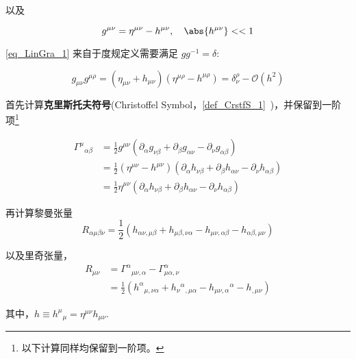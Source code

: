 以及

\begin{equation}\label{eq_LinGra_1}
g^{\mu\nu} = \eta^{\mu\nu} - h^{\mu\nu} , \quad \abs{h^{\mu\nu}}<<1 
\end{equation}

\autoref{eq_LinGra_1} 来自于度规定义需要满足 $gg^{-1}=\delta$:

\begin{equation}
g_{\mu\nu}g^{\mu\rho} = (\eta_{\mu\nu} + h_{\mu\nu})(\eta^{\mu\rho} - h^{\mu\rho}) = \delta^{\rho}_{\nu} - \mathcal{O}(h^2)
\end{equation}

首先计算\textbf{克里斯托夫符号}(Christoffel Symbol，\autoref{def_CrstfS_1}~)，并保留到一阶项\footnote{以下计算同样均保留到一阶项。}

\begin{equation}
\begin{aligned}
\Gamma^{\mu}{}_{\alpha\beta}&=\frac{1}{2}g^{\mu\nu}(\partial_\alpha g_{\nu\beta} + \partial_\beta g_{\alpha\nu} - \partial_\nu g_{\alpha\beta})\\
&=\frac{1}{2}(\eta^{\mu\nu} - h^{\mu\nu})(\partial_\alpha h_{\nu\beta} + \partial_\beta h_{\alpha\nu} - \partial_\nu h_{\alpha\beta})\\
&=\frac{1}{2}\eta^{\mu\nu} (\partial_\alpha h_{\nu\beta} + \partial_\beta h_{\alpha\nu} - \partial_\nu h_{\alpha\beta})
\end{aligned}
\end{equation}



再计算黎曼张量
\begin{equation}
R_{\alpha \mu \beta \nu}=\frac{1}{2}\left(h_{\alpha \nu, \mu \beta}+h_{\mu \beta, \nu \alpha}-h_{\mu \nu, \alpha \beta}-h_{\alpha \beta, \mu \nu}\right)
\end{equation}


以及里奇张量，
\begin{equation}
\begin{aligned}
R_{\mu\nu} &= \Gamma^{\alpha}{}_{\mu\nu,\alpha} - \Gamma^{\alpha}_{\mu\alpha,\nu}\\
&=\frac{1}{2}\left(h^{\alpha}{}_{\mu, \nu \alpha} + h_{\nu}{ }^{\alpha}{ }_{, \mu \alpha}-h_{\mu \nu, \alpha}{ }^{\alpha}-h_{, \mu \nu}\right)
\end{aligned}
\end{equation}


其中，$h\equiv h^{\mu}{}_{\mu}=\eta^{\mu\nu}h_{\mu\nu}$.

